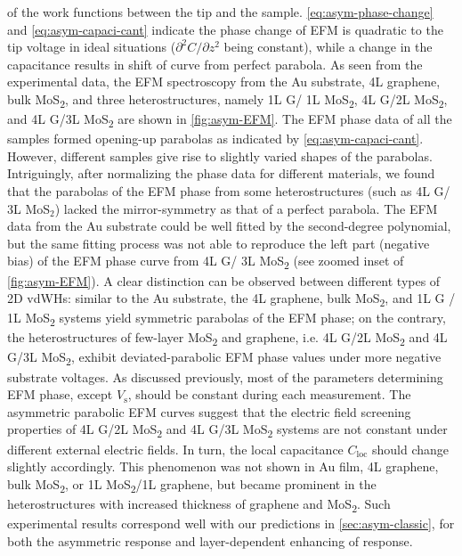 of the work functions between the tip and the sample.
%
\autoref{eq:asym-phase-change} and \autoref{eq:asym-capaci-cant}
indicate the phase change of EFM is quadratic to the tip voltage in
ideal situations ($\partial^{2} C / \partial z^{2}$ being constant),
while a change in the capacitance results in shift of curve from perfect parabola.
%
As seen from the experimental data, the EFM spectroscopy from the Au
substrate, 4L graphene, bulk MoS\textsubscript{2}, and three
heterostructures, namely 1L G/ 1L MoS\textsubscript{2}, 4L G/2L
MoS\textsubscript{2}, and 4L G/3L MoS\textsubscript{2} are shown in
\autoref{fig:asym-EFM}.  The EFM phase data of all the samples formed
opening-up parabolas as indicated by \autoref{eq:asym-capaci-cant}.
%
However, different
samples give rise to slightly varied shapes of the parabolas.
%
Intriguingly, after normalizing the phase data for different
materials, we found that the parabolas of the EFM phase from some
heterostructures (such as 4L G/ 3L MoS$_{2}$) lacked the
mirror-symmetry as that of a perfect parabola.
%
The EFM data from the Au substrate could be well fitted by the
second-degree polynomial, but the same fitting process was not able to
reproduce the left part (negative bias) of the EFM phase curve from 4L
G/ 3L MoS\textsubscript{2} (see zoomed inset of
\autoref{fig:asym-EFM}).
%
A clear distinction can be observed between different types of 2D
vdWHs: similar to the Au substrate, the 4L graphene, bulk
MoS\textsubscript{2}, and 1L G / 1L MoS\textsubscript{2} systems yield
symmetric parabolas of the EFM phase; on the contrary, the
heterostructures of few-layer MoS\textsubscript{2} and graphene,
i.e. 4L G/2L MoS\textsubscript{2} and 4L G/3L
MoS\textsubscript{2}, exhibit deviated-parabolic EFM phase
values under more negative substrate voltages.
%
%
As discussed previously, most of the parameters determining EFM phase,
except $V_{\mathrm{s}}$, should be constant during each
measurement. The asymmetric parabolic EFM curves suggest that the
electric field screening properties of 4L G/2L MoS\textsubscript{2} and 4L G/3L MoS\textsubscript{2} systems are not
constant under different external electric fields. In turn, the local capacitance $C_{\mathrm{loc}}$ should change slightly
accordingly. This phenomenon was not shown in Au film, 4L graphene,
bulk MoS\textsubscript{2}, or 1L MoS\textsubscript{2}/1L graphene, but
became prominent in the heterostructures with increased thickness of
graphene and MoS\textsubscript{2}.
%
Such experimental results correspond well with our predictions in
\autoref{sec:asym-classic}, for both the asymmetric response and
layer-dependent enhancing of response.

